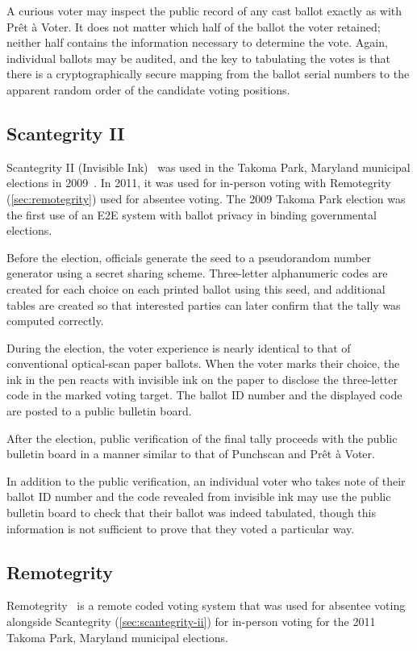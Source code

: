 A curious voter may inspect the public record of any cast ballot
exactly as with Prêt à Voter. It does not matter which half of the
ballot the voter retained; neither half contains the information necessary to determine the vote. Again, individual ballots may
be audited, and the key to tabulating the votes is that there is a
cryptographically secure mapping from the ballot serial numbers to the
apparent random order of the candidate voting positions.

\subsection{Scantegrity II}
\label{sec:scantegrity-ii}

Scantegrity II (Invisible Ink)~\cite{chaum2008,chaum2009} was used in
the Takoma Park, Maryland municipal elections in
2009~\cite{carback2010}. In 2011, it was used for in-person voting
with Remotegrity (\autoref{sec:remotegrity}) used for absentee voting. The
2009 Takoma Park election was the first use of an E2E system with
ballot privacy in binding governmental elections.

Before the election, officials generate the seed to a pseudorandom
number generator using a secret sharing scheme. Three-letter
alphanumeric codes are created for each choice on each printed ballot
using this seed, and additional tables are created so that interested
parties can later confirm that the tally was computed correctly.

During the election, the voter experience is nearly identical to that
of conventional optical-scan paper ballots. When the voter marks their
choice, the ink in the pen reacts with invisible ink on the paper to
disclose the three-letter code in the marked voting target. The ballot
ID number and the displayed code are posted to a public bulletin
board.

After the election, public verification of the final tally proceeds
with the public bulletin board in a manner similar to that of
Punchscan and Prêt à Voter.

In addition to the public verification, an individual voter who takes
note of their ballot ID number and the code revealed from invisible
ink may use the public bulletin board to check that their ballot was
indeed tabulated, though this information is not sufficient to prove
that they voted a particular way.

\subsection{Remotegrity}
\label{sec:remotegrity}
Remotegrity~\cite{zagorski2013} is a remote coded voting system that
was used for absentee voting alongside Scantegrity
(\autoref{sec:scantegrity-ii}) for in-person voting for the 2011
Takoma Park, Maryland municipal elections.

